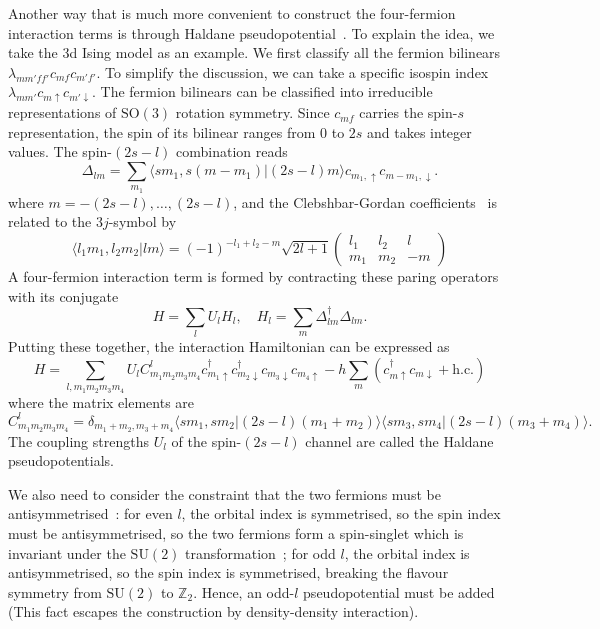 \documentclass{timesjhep}
\begin{document}
Another way that is much more convenient to construct the four-fermion interaction terms is through Haldane pseudopotential~\cite{Haldane1983LLL,Trugman1985Pseudo}. To explain the idea, we take the 3d Ising model as an example. We first classify all the fermion bilinears $\lambda_{mm'ff'}c_{mf}c_{m'f'}$. To simplify the discussion, we can take a specific isospin index $\lambda_{mm'}c_{m\uparrow}c_{m'\downarrow}$. The fermion bilinears can be classified into irreducible representations of $\mathrm{SO}(3)$ rotation symmetry. Since $c_{mf}$ carries the spin-$s$ representation, the spin of its bilinear ranges from $0$ to $2s$ and takes integer values. The spin-$(2s-l)$ combination reads 
\begin{equation}
    \Delta_{lm}=\sum_{m_1}\langle sm_1,s(m-m_1)|(2s-l)m\rangle c_{m_1,\uparrow}c_{m-m_1,\downarrow}.
    \label{eq:ising_pair}
\end{equation} 
where $m=-(2s-l),\dots,(2s-l)$, and the Clebshbar-Gordan coefficients~\cite{Biedenharn1984Angular} is related to the $3j$-symbol by
\begin{equation}
    \langle l_1m_1,l_2m_2|lm\rangle=(-1)^{-l_1+l_2-m}\sqrt{2l+1}\begin{pmatrix}l_1&l_2&l\\m_1&m_2&-m\end{pmatrix}
\end{equation}
A four-fermion interaction term is formed by contracting these paring operators with its conjugate
\begin{equation}
    H=\sum_lU_lH_l,\quad H_l=\sum_m\Delta_{lm}^\dagger\Delta_{lm}.
\end{equation} 
Putting these together, the interaction Hamiltonian can be expressed as 
\begin{equation}
    H=\sum_{l,m_1m_2m_3m_4}U_lC^l_{m_1m_2m_3m_4}c^\dagger_{m_1\uparrow}c^\dagger_{m_2\downarrow}c_{m_3\downarrow}c_{m_4\uparrow}-h\sum_m(c_{m\uparrow}^\dagger c_{m\downarrow}+\mathrm{h.c.})
\end{equation}
where the matrix elements are 
\begin{equation}
    C^l_{m_1m_2m_3m_4}=\delta_{m_1+m_2,m_3+m_4}\langle sm_1,sm_2|(2s-l)(m_1+m_2)\rangle\langle sm_3,sm_4|(2s-l)(m_3+m_4)\rangle.
    \label{eq:ps_pot_coeff}
\end{equation} 
The coupling strengths $U_l$ of the spin-$(2s-l)$ channel are called the Haldane pseudopotentials. 

We also need to consider the constraint that the two fermions must be antisymmetrised~: for even $l$, the orbital index is symmetrised, so the spin index must be antisymmetrised, so the two fermions form a spin-singlet which is invariant under the $\mathrm{SU}(2)$ transformation~; for odd $l$, the orbital index is antisymmetrised, so the spin index is symmetrised, breaking the flavour symmetry from $\mathrm{SU}(2)$ to $\mathbb{Z}_2$. Hence, an odd-$l$ pseudopotential must be added (This fact escapes the construction by density-density interaction). 
\end{document}
